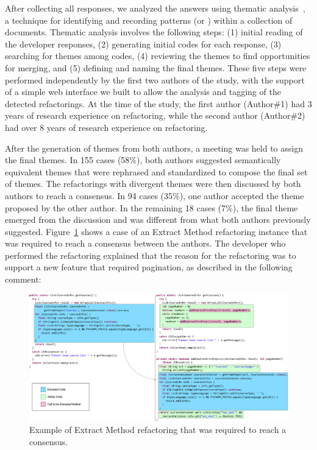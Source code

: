 After collecting all responses, we analyzed the answers using thematic analysis~\citep{Cruzes:2011}, a technique for identifying and recording patterns (or ) within a collection of documents.
Thematic analysis involves the following steps: (1) initial reading of the developer responses, (2) generating initial codes for each response, (3) searching for themes among codes, (4) reviewing the themes to find opportunities for merging, and (5) defining and naming the final themes.
These five steps were performed independently by the first two authors of the study,  with the support of a simple web interface we built to allow the analysis and tagging of the detected refactorings.
At the time of the study, the first author (Author\#1) had 3 years of research experience on refactoring, while the second author (Author\#2) had over 8 years of research experience on refactoring.

After the generation of themes from both authors, a meeting was held to assign the final themes. In 155 cases (58\%), both authors suggested semantically equivalent themes that were rephrased and standardized to compose the final set of themes. The refactorings with divergent themes were then discussed by both authors to reach a consensus. In 94 cases (35\%), one author accepted the theme proposed by the other author. In the remaining 18 cases (7\%), the final theme emerged from the discussion and was different from what both authors previously suggested.
Figure~\ref{fig:consenus_example} shows a case of an {\textsc Extract Method} refactoring instance that was required to reach a consensus between the authors. The developer who performed the refactoring explained that the reason for the refactoring was to support a new feature that required pagination, as described in the following comment:\margin

\margin

\begin{figure}[htbp]
	\centering
	\includegraphics[width=0.9\linewidth]{img/code-sample.pdf}
	\caption{Example of Extract Method refactoring that was required to reach a consensus.}
	\label{fig:consenus_example}
\end{figure}

